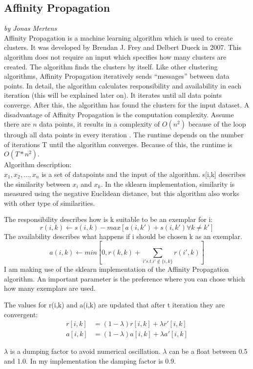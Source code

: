 \subsection{Affinity Propagation}
\textit{by Jonas Mertens}\\
	
Affinity Propagation is a machine learning algorithm which is used to create clusters. It was developed by Brendan J. Frey and Delbert Dueck in 2007. This algorithm does not require an input which specifies how many clusters are created. The algorithm finds the clusters by itself. Like other clustering algorithms, Affinity Propagation iteratively sends “messages” between data points. In detail, the algorithm calculates responsibility and availability in each iteration (this will be explained later on). It iterates until all data points converge. After this, the algorithm has found the clusters for the input dataset. A disadvantage of Affinity Propagation is the computation complexity. Assume there are $n$ data points, it results in a complexity of $O(n^2)$ because of the loop through all data points in every iteration \cite{afpaper}. The runtime depends on the number of iterations T until the algorithm converges. Because of this, the runtime is $O(T* n^2)$.\\ 
Algorithm description: \\
$x_1, x_2 , \dots,  x_n$ is a set of datapoints and the input of the algorithm. s[i,k] describes the similarity between $x_i$ and $x_k$. In the \gls{sklearn} implementation, similarity is measured using the negative Euclidean distance, but this algorithm also works with other type of similarities. 

The responsibility describes how is k suitable to be an exemplar for i:
\begin{equation}
r(i,k) \leftarrow  s(i,k) - max \left [ a(i,k') + s(i, k') \forall k \neq k' \right ]
\end{equation}
The availability describes what happens if i should be chosen k as an exemplar. 
\begin{equation}
a(i,k) \leftarrow  min \left [ 0, r(k,k) +  \sum_{i' s.t. i'\notin \{i,k\}} r(i',k) \right ]
\end{equation}
I am making use of the \gls{sklearn} implementation of the Affinity Propagation algorithm. An important parameter is the preference where you can chose which how many exemplars are used. 
	
The values for r(i,k) and a(i,k) are updated that after t iteration they are convergent:
\begin{align}
r \left [ i,k \right ] &= (1-\lambda)r \left [ i,k \right ] + \lambda r' \left [ i,k \right ]\\
a \left [ i,k \right ] &= (1-\lambda)a \left [ i,k \right ] + \lambda a' \left [ i,k \right ]  
\end{align}
	
$\lambda$ is a dumping factor to avoid numerical oscillation. $\lambda$ can be a float between 0.5 and 1.0. In my implementation the damping factor is 0.9. 
	
	